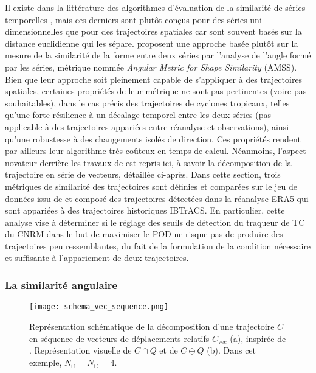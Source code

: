 \documentclass[../main.tex]{subfiles}
\begin{document}
Il existe dans la littérature des algorithmes d'évaluation de la similarité de séries temporelles
\parencite{faloutsos_fast_1994,das_finding_1997,frentzos_indexbased_2007}, mais ces derniers sont plutôt conçus pour des séries uni-dimensionnelles que pour des
trajectoires spatiales car sont souvent basés sur la distance euclidienne qui les sépare. \textcite{nakamura_shapebased_2013} proposent une approche basée plutôt
sur la mesure de la similarité de la forme entre deux séries par l'analyse de l'angle formé par les séries, métrique nommée \textit{Angular Metric for Shape
Similarity} (AMSS). Bien que leur approche soit pleinement capable de s'appliquer à des trajectoires spatiales, certaines propriétés de leur métrique ne sont
pas pertinentes (voire pas souhaitables), dans le cas précis des trajectoires de cyclones tropicaux, telles qu'une forte résilience à un décalage temporel entre
les deux séries (pas applicable à des trajectoires appariées entre réanalyse et observations), ainsi qu'une robustesse à des changements isolés de direction.
Ces propriétés rendent par ailleurs leur algorithme très coûteux en temps de calcul. Néanmoins, l'aspect novateur derrière les travaux de
\textcite{nakamura_shapebased_2013} est repris ici, à savoir la décomposition de la trajectoire en série de vecteurs, détaillée ci-après. Dans cette section, trois
métriques de similarité des trajectoires sont définies et comparées sur le jeu de données issu de \textcite{dulac_assessing_2023} et composé des trajectoires
détectées dans la réanalyse ERA5 qui sont appariées à des trajectoires historiques IBTrACS. En particulier, cette analyse vise à déterminer si le réglage des
seuils de détection du traqueur de TC du CNRM dans le but de maximiser le POD ne risque pas de produire des trajectoires peu ressemblantes, du fait de la
formulation de la condition nécessaire et suffisante à l'appariement de deux trajectoires.

\subsubsection*{La similarité angulaire}

\begin{figure}[htbp]
    \centering
    \texttt{[image: schema\_vec\_sequence.png]}
    \caption{Représentation schématique de la décomposition d'une trajectoire $C$ en séquence de vecteurs de déplacements relatifs $C_{\text{vec}}$ (a),
    inspirée de \textcite{nakamura_shapebased_2013}. Représentation visuelle de $C \cap Q$ et de $C \ominus Q$ (b). Dans cet exemple, $N_\cap = N_\ominus = 4$.}
    \label{fig:schema_trajectoires}
\end{figure}
\end{document}
